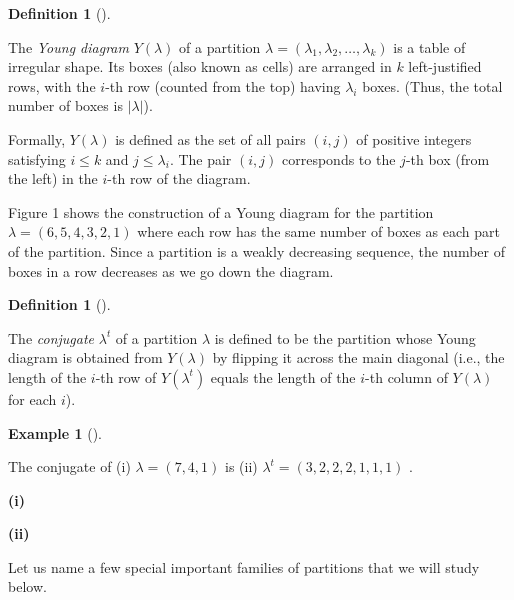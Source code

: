 \documentclass[numbers=enddot,12pt,final,onecolumn,notitlepage]{scrartcl}%
\theoremstyle{definition}
\newtheorem{defi}[theo]{Definition}
\newenvironment{definition}[1][]
{\begin{defi}[#1]\begin{leftbar}}
{\end{leftbar}\end{defi}}
\newtheorem{exam}[theo]{Example}
\newenvironment{example}[1][]
{\begin{exam}[#1]\begin{leftbar}}
{\end{leftbar}\end{exam}}
\newcommand{\abs}[1]{\left| #1 \right|}
\newcommand{\tup}[1]{\left( #1 \right)}
\renewcommand{\leq}{\leqslant}
\theoremstyle{plainsl}
\begin{document}
\begin{definition}
The \emph{Young diagram} $Y\tup{\lambda}$ of a partition
$\lambda = \left(\lambda_1, \lambda_2, \ldots, \lambda_k\right)$
is a table of irregular shape.
Its boxes (also known as cells) are arranged in
$k$ left-justified rows, with the $i$-th row (counted from the top)
having $\lambda_i$ boxes. (Thus, the total number of boxes
is $\abs{\lambda}$).

Formally, $Y\tup{\lambda}$ is defined as the set of all pairs
$\tup{i, j}$ of positive integers satisfying $i \leq k$ and
$j \leq \lambda_i$. The pair $\tup{i, j}$ corresponds to the
$j$-th box (from the left) in the $i$-th row of the diagram.
\end{definition}

Figure 1 shows the construction of a Young diagram for the partition $\lambda = (6,5,4,3,2,1)$ where each row has the same number of boxes as each part of the partition. Since a partition is a weakly decreasing sequence, the number of boxes in a row decreases as we go down the diagram.

\begin{definition}
The \emph{conjugate} $\lambda^t$ of a partition $\lambda$ is defined to be the partition whose Young diagram is obtained from $Y\tup{\lambda}$ by flipping it across the main diagonal (i.e., the length of the $i$-th row of $Y\tup{\lambda^t}$ equals the length of the $i$-th column of $Y\tup{\lambda}$ for each $i$).
\end{definition} 

\begin{example}
The conjugate of (i) $\lambda = (7,4,1)$ is (ii) $\lambda^t =(3,2,2,2,1,1,1)$ . \\

\begin{minipage}[t]{0.49\textwidth}
\begin{center}

\textbf{(i)}
\end{center}
\end{minipage}
\begin{minipage}[t]{0.49\textwidth}
\begin{center}
\textbf{(ii)}
\end{center}
\end{minipage}

 

\end{example}
Let us name a few special important families of partitions that we will study below.
\end{document}
